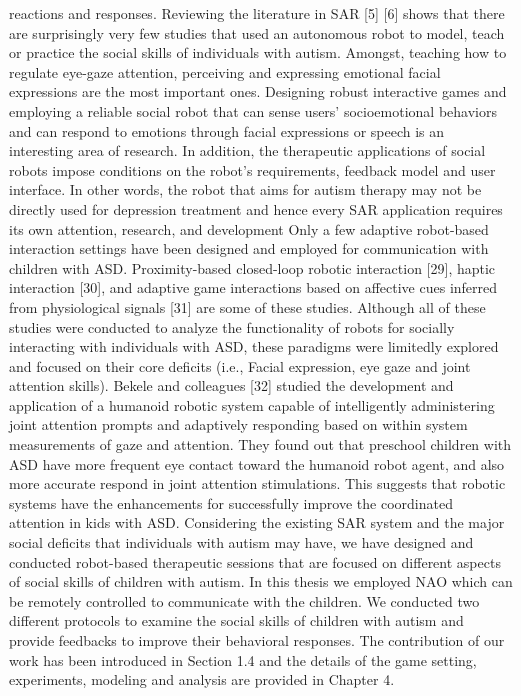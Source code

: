 reactions and responses.
Reviewing the literature in SAR [5] [6] shows that there are surprisingly very few
studies that used an autonomous robot to model, teach or practice the social skills of
individuals with autism. Amongst, teaching how to regulate eye-gaze attention, perceiving
and expressing emotional facial expressions are the most important ones. Designing robust
interactive games and employing a reliable social robot that can sense users’ socioemotional
behaviors and can respond to emotions through facial expressions or speech is
an interesting area of research. In addition, the therapeutic applications of social robots
impose conditions on the robot’s requirements, feedback model and user interface. In other
words, the robot that aims for autism therapy may not be directly used for depression
treatment and hence every SAR application requires its own attention, research, and
development
Only a few adaptive robot-based interaction settings have been designed and
employed for communication with children with ASD. Proximity-based closed-loop
robotic interaction [29], haptic interaction [30], and adaptive game interactions based on
affective cues inferred from physiological signals [31] are some of these studies. Although
all of these studies were conducted to analyze the functionality of robots for socially interacting with individuals with ASD, these paradigms were limitedly explored and
focused on their core deficits (i.e., Facial expression, eye gaze and joint attention skills).
Bekele and colleagues [32] studied the development and application of a humanoid
robotic system capable of intelligently administering joint attention prompts and adaptively
responding based on within system measurements of gaze and attention. They found out
that preschool children with ASD have more frequent eye contact toward the humanoid
robot agent, and also more accurate respond in joint attention stimulations. This suggests
that robotic systems have the enhancements for successfully improve the coordinated
attention in kids with ASD.
Considering the existing SAR system and the major social deficits that individuals
with autism may have, we have designed and conducted robot-based therapeutic sessions
that are focused on different aspects of social skills of children with autism. In this thesis
we employed NAO which can be remotely controlled to communicate with the children.
We conducted two different protocols to examine the social skills of children with autism
and provide feedbacks to improve their behavioral responses. The contribution of our work
has been introduced in Section 1.4 and the details of the game setting, experiments,
modeling and analysis are provided in Chapter 4.


